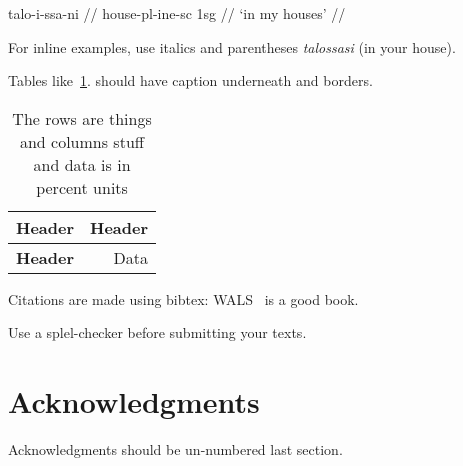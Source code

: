 \documentclass[b5paper]{article}
\begin{document}
\ex
\begingl
\gla talo-i-ssa-ni //
\glb house-{\sc pl}-{\sc ine}-{sc 1sg} //
\glft `in my houses' //
\endgl
\xe

For inline examples, use italics and parentheses \emph{talossasi} (in your
house).

Tables like~\ref{table:example}. should have caption underneath and borders.

\begin{table}
    \center
    \begin{tabular}{|l|r|}
        \hline
        \bf Header & \bf Header \\
        \hline
        \bf Header & Data \\
        \hline
    \end{tabular}
    \caption{The rows are things and columns stuff and data is in percent units
    \label{table:example}}
\end{table}

Citations are made using bibtex: WALS~\cite{haspelmath2005world} is a good book.


Use a splel-checker before submitting your texts.

\section*{Acknowledgments}

Acknowledgments should be un-numbered last section.



\end{document}
